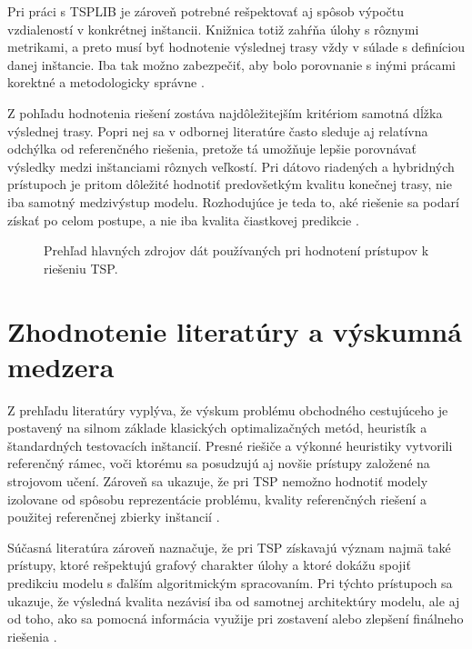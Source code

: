Pri práci s TSPLIB je zároveň potrebné rešpektovať aj spôsob výpočtu vzdialeností
v konkrétnej inštancii. Knižnica totiž zahŕňa úlohy s rôznymi metrikami, a
preto musí byť hodnotenie výslednej trasy vždy v súlade s definíciou danej
inštancie. Iba tak možno zabezpečiť, aby bolo porovnanie s inými prácami
korektné a metodologicky správne \parencite{reinelt1991tsplib}.

Z pohľadu hodnotenia riešení zostáva najdôležitejším kritériom samotná dĺžka
výslednej trasy. Popri nej sa v odbornej literatúre často sleduje aj relatívna
odchýlka od referenčného riešenia, pretože tá umožňuje lepšie porovnávať
výsledky medzi inštanciami rôznych veľkostí. Pri dátovo riadených a hybridných
prístupoch je pritom dôležité hodnotiť predovšetkým kvalitu konečnej trasy,
nie iba samotný medzivýstup modelu. Rozhodujúce je teda to, aké riešenie sa
podarí získať po celom postupe, a nie iba kvalita čiastkovej predikcie
\parencite{joshi2022generalization,hudson2022gls,xin2021neurolkh}.

\begin{figure}[H]
    \centering
    
    \caption{Prehľad hlavných zdrojov dát používaných pri hodnotení prístupov
             k riešeniu TSP.}
    \label{fig:benchmarks}
\end{figure}

\FloatBarrier

\section{Zhodnotenie literatúry a výskumná medzera}

Z prehľadu literatúry vyplýva, že výskum problému obchodného cestujúceho je
postavený na silnom základe klasických optimalizačných metód, heuristík
a štandardných testovacích inštancií. Presné riešiče a výkonné heuristiky vytvorili
referenčný rámec, voči ktorému sa posudzujú aj novšie prístupy založené
na strojovom učení. Zároveň sa ukazuje, že pri TSP nemožno hodnotiť modely
izolovane od spôsobu reprezentácie problému, kvality referenčných riešení
a použitej referenčnej zbierky inštancií \parencite{bengio2021mlco,reinelt1991tsplib,
joshi2022generalization}.

Súčasná literatúra zároveň naznačuje, že pri TSP získavajú význam najmä také
prístupy, ktoré rešpektujú grafový charakter úlohy a ktoré dokážu spojiť
predikciu modelu s ďalším algoritmickým spracovaním. Pri týchto prístupoch sa
ukazuje, že výsledná kvalita nezávisí iba od samotnej architektúry modelu,
ale aj od toho, ako sa pomocná informácia využije pri zostavení alebo zlepšení
finálneho riešenia \parencite{joshi2019gcn,hudson2022gls,xin2021neurolkh}.

